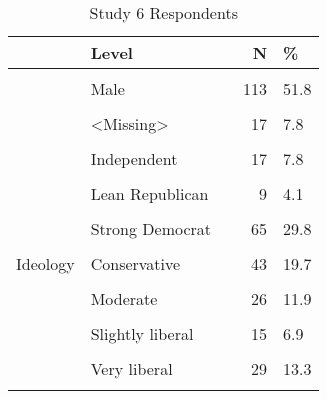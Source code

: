 \documentclass[border=1mm]{standalone}
\begin{document}
\begin{table}[!h]
\centering
\caption{Study 6 Respondents}
\centering
\begin{tabular}[t]{lllrl}
\toprule
  & Level &   & N & \%\\
\midrule
\cellcolor{gray!10}{Sex} & \cellcolor{gray!10}{Female} & \cellcolor{gray!10}{} & \cellcolor{gray!10}{88} & \cellcolor{gray!10}{40.4}\\
 & Male &  & 113 & 51.8\\
\cellcolor{gray!10}{} & \cellcolor{gray!10}{other} & \cellcolor{gray!10}{} & \cellcolor{gray!10}{0} & \cellcolor{gray!10}{0.0}\\
 & <Missing> &  & 17 & \vphantom{1} 7.8\\
\cellcolor{gray!10}{Party} & \cellcolor{gray!10}{Democrat} & \cellcolor{gray!10}{} & \cellcolor{gray!10}{65} & \cellcolor{gray!10}{29.8}\\
\addlinespace
 & Independent &  & 17 & 7.8\\
\cellcolor{gray!10}{} & \cellcolor{gray!10}{Lean Democrat} & \cellcolor{gray!10}{} & \cellcolor{gray!10}{12} & \cellcolor{gray!10}{5.5}\\
 & Lean Republican &  & 9 & 4.1\\
\cellcolor{gray!10}{} & \cellcolor{gray!10}{Republican} & \cellcolor{gray!10}{} & \cellcolor{gray!10}{21} & \cellcolor{gray!10}{9.6}\\
 & Strong Democrat &  & 65 & 29.8\\
\addlinespace
\cellcolor{gray!10}{} & \cellcolor{gray!10}{Strong Republican} & \cellcolor{gray!10}{} & \cellcolor{gray!10}{29} & \cellcolor{gray!10}{13.3}\\
Ideology & Conservative &  & 43 & 19.7\\
\cellcolor{gray!10}{} & \cellcolor{gray!10}{Liberal} & \cellcolor{gray!10}{} & \cellcolor{gray!10}{38} & \cellcolor{gray!10}{17.4}\\
 & Moderate &  & 26 & 11.9\\
\cellcolor{gray!10}{} & \cellcolor{gray!10}{Slightly conservative} & \cellcolor{gray!10}{} & \cellcolor{gray!10}{8} & \cellcolor{gray!10}{3.7}\\
\addlinespace
 & Slightly liberal &  & 15 & 6.9\\
\cellcolor{gray!10}{} & \cellcolor{gray!10}{Very conservative} & \cellcolor{gray!10}{} & \cellcolor{gray!10}{42} & \cellcolor{gray!10}{19.3}\\
 & Very liberal &  & 29 & 13.3\\
\cellcolor{gray!10}{} & \cellcolor{gray!10}{<Missing>} & \cellcolor{gray!10}{} & \cellcolor{gray!10}{17} & \cellcolor{gray!10}{7.8}\\

\end{tabular}
\end{table}
\end{document}
